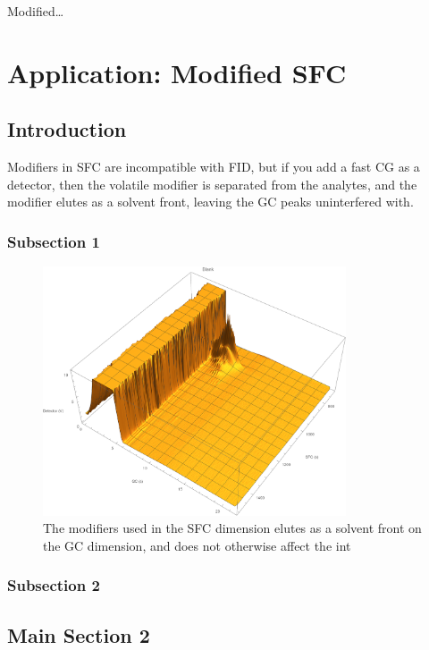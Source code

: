 
\begin{savequote}[45mm]
Modified\ldots
{}
\end{savequote}

\chapter{Application: Modified SFC} %

\label{Chapter7} %


\section{Introduction}

Modifiers in SFC are incompatible with FID, but if you add a fast CG as a
detector, then the volatile modifier is separated from the analytes, and the
modifier elutes as a solvent front, leaving the GC peaks uninterfered with.


\subsection{Subsection 1}

\begin{figure}
	\centering
	\includegraphics[width=0.8\textwidth]{Figures/Modifier.pdf}
	\decoRule	
	
	\caption[Modifiers in SFC]{The modifiers used in the SFC dimension elutes as a
solvent front on the GC dimension, and does not otherwise affect the int}
	
	\label{fig:LoopTuning} 
\end{figure}
\subsection{Subsection 2}


\section{Main Section 2}
